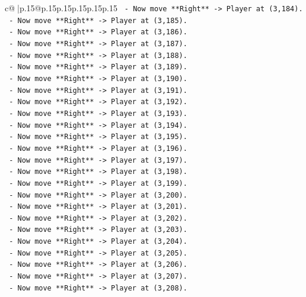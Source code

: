 \documentclass{article}
\begin{document}
{\begin{supertabular}{c@{$\;$}|p{.15\linewidth}@{}p{.15\linewidth}p{.15\linewidth}p{.15\linewidth}p{.15\linewidth}p{.15\linewidth}}
{{{\texttt{    {-}   Now move **Right** {-}> Player at (3,184).} \\
\texttt{    {-}   Now move **Right** {-}> Player at (3,185).} \\
\texttt{    {-}   Now move **Right** {-}> Player at (3,186).} \\
\texttt{    {-}   Now move **Right** {-}> Player at (3,187).} \\
\texttt{    {-}   Now move **Right** {-}> Player at (3,188).} \\
\texttt{    {-}   Now move **Right** {-}> Player at (3,189).} \\
\texttt{    {-}   Now move **Right** {-}> Player at (3,190).} \\
\texttt{    {-}   Now move **Right** {-}> Player at (3,191).} \\
\texttt{    {-}   Now move **Right** {-}> Player at (3,192).} \\
\texttt{    {-}   Now move **Right** {-}> Player at (3,193).} \\
\texttt{    {-}   Now move **Right** {-}> Player at (3,194).} \\
\texttt{    {-}   Now move **Right** {-}> Player at (3,195).} \\
\texttt{    {-}   Now move **Right** {-}> Player at (3,196).} \\
\texttt{    {-}   Now move **Right** {-}> Player at (3,197).} \\
\texttt{    {-}   Now move **Right** {-}> Player at (3,198).} \\
\texttt{    {-}   Now move **Right** {-}> Player at (3,199).} \\
\texttt{    {-}   Now move **Right** {-}> Player at (3,200).} \\
\texttt{    {-}   Now move **Right** {-}> Player at (3,201).} \\
\texttt{    {-}   Now move **Right** {-}> Player at (3,202).} \\
\texttt{    {-}   Now move **Right** {-}> Player at (3,203).} \\
\texttt{    {-}   Now move **Right** {-}> Player at (3,204).} \\
\texttt{    {-}   Now move **Right** {-}> Player at (3,205).} \\
\texttt{    {-}   Now move **Right** {-}> Player at (3,206).} \\
\texttt{    {-}   Now move **Right** {-}> Player at (3,207).} \\
\texttt{    {-}   Now move **Right** {-}> Player at (3,208).} \\
}}}
\end{supertabular}}
\end{document}
